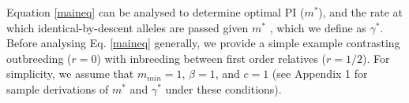 \documentclass[12pt]{article}
\begin{document}
Equation \ref{maineq} can be analysed to determine optimal PI ($m^{*}$), and the rate at which identical-by-descent alleles are passed given $m^{*}$ \cite[][]{Kuijper2012}, which we define as $\gamma^{*}$. Before analysing Eq. \ref{maineq} generally, we provide a simple example contrasting outbreeding ($r=0$) with inbreeding between first order relatives ($r=1/2$). For simplicity, we assume that $m_{min}=1$, $\beta=1$, and $c=1$ (see Appendix 1 for sample derivations of $m^{*}$ and $\gamma^{*}$ under these conditions). %
\end{document}
